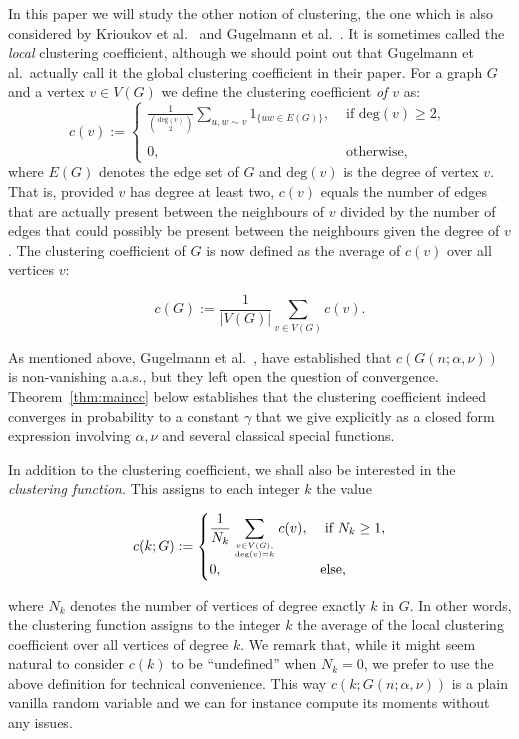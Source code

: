 In this paper we will study the other notion of clustering, the one which is also considered by Krioukov et al.~\cite{krioukov2010hyperbolic} and
Gugelmann et al.~\cite{gugelmann2012random}. 
It is sometimes called the {\em local} clustering coefficient, although we should point out that Gugelmann et al.~actually
call it the global clustering coefficient in their paper.
For a graph $G$ and a vertex $v\in V(G)$ we define the clustering coefficient {\em of $v$} as:
\[
	c(v) := \left\{\begin{array}{cl}
		\displaystyle \frac{1}{{\text{deg}(v)\choose 2}} \sum_{u,w\sim v} 1_{\{uw \in E(G)\}}, 
			& \text{ if $\text{deg}(v) \geq 2$, }\\
		& \\
        0, & \text{ otherwise,}
        \end{array}\right.
\]
where $E(G)$ denotes the edge set of $G$ and $\text{deg}(v)$ is the degree of vertex $v$. That is, provided $v$ has degree at least two, $c(v)$ equals the number of edges that are actually present between the neighbours  of $v$ divided by the
number of edges that could possibly be present between the neighbours given the degree of $v$.
The clustering coefficient of $G$ is now defined as the average of $c(v)$ over all vertices $v$:

$$ c(G) := \frac{1}{|V(G)|} \sum_{v\in V(G)} c(v). $$

As mentioned above, Gugelmann et al.~\cite{gugelmann2012random}, have established that $c(G(n;\alpha,\nu))$ is non-vanishing a.a.s., but they left 
open the question of convergence.
Theorem~\ref{thm:maincc} below establishes that the clustering coefficient indeed converges in probability to a constant
$\gamma$ that we give explicitly as a closed form expression involving $\alpha,\nu$ and several classical special functions.

In addition to the clustering coefficient, we shall also be interested in the {\em clustering function}.
This assigns to each integer $k$ the value

$$ c(k; G) := \begin{cases}
		\displaystyle \frac{1}{N_k} \sum_{v \in V(G), \atop \text{deg}(v)=k}  c(v),  &\mbox{ if } N_k \ge 1,\\
		0, &\mbox{else,}
	\end{cases}
	$$
	
\noindent
where $N_k$ denotes the number of vertices of degree exactly $k$ in $G$.
In other words, the clustering function assigns to the integer $k$ the average of the local clustering coefficient over all vertices of degree $k$. 
We remark that, while it might seem natural to consider $c(k)$ to be ``undefined'' when $N_k=0$, we prefer to use the above definition for technical 
convenience.  This way $c(k; G(n;\alpha,\nu) )$ is a plain vanilla random variable and we can for instance compute its moments without any issues.

